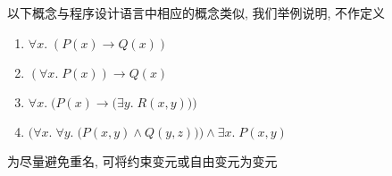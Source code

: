 \begin{frame}{}
  \begin{center}
    以下概念与程序设计语言中相应的概念类似, 我们举例说明, 不作定义
  \end{center}

  \begin{definition}
    \begin{enumerate}[(1)]
      \setlength{\itemsep}{6pt}
      \item $\forall x.\; (P(x) \to Q(x))$
      \item $(\forall x.\; P(x)) \to Q(x)$
      \item $\forall x.\; \Big(P(x) \to \big(\exists y.\; R(x, y)\big)\Big)$
      \item $\Big(\forall x.\; \forall y.\; \big(P(x, y) \land Q(y, z)\big)\Big) \land \exists x.\; P(x, y)$
    \end{enumerate}
  \end{definition}

  \pause
  \vspace{0.30cm}
  \begin{definition}[改名 (Rename)]
    为尽量避免重名, 可将约束变元或自由变元为变元
  \end{definition}
\end{frame}
